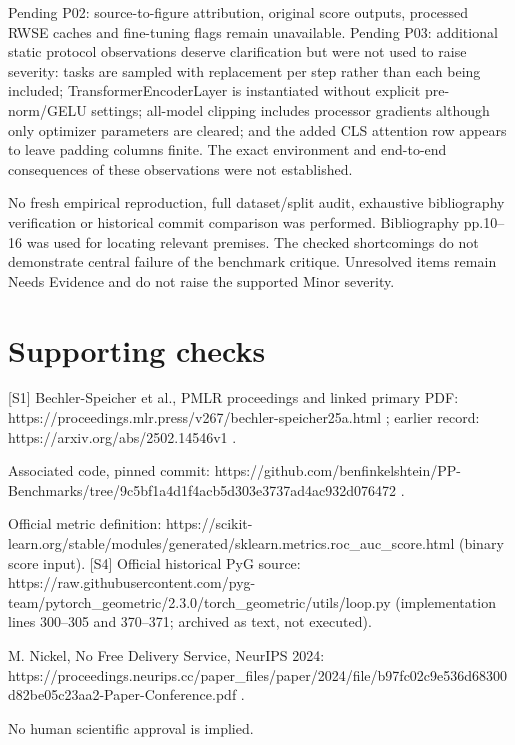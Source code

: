\documentclass[10pt]{article}
\begin{document}
Pending P02: source-to-figure attribution, original score outputs, processed RWSE caches and fine-tuning flags remain unavailable. Pending P03: additional static protocol observations deserve clarification but were not used to raise severity: tasks are sampled with replacement per step rather than each being included; TransformerEncoderLayer is instantiated without explicit pre-norm/GELU settings; all-model clipping includes processor gradients although only optimizer parameters are cleared; and the added CLS attention row appears to leave padding columns finite. The exact environment and end-to-end consequences of these observations were not established.\par
No fresh empirical reproduction, full dataset/split audit, exhaustive bibliography verification or historical commit comparison was performed. Bibliography pp.10–16 was used for locating relevant premises. The checked shortcomings do not demonstrate central failure of the benchmark critique. Unresolved items remain Needs Evidence and do not raise the supported Minor severity.\par
\section*{Supporting checks}
[S1] Bechler-Speicher et al., PMLR proceedings and linked primary PDF: https://proceedings.mlr.press/v267/bechler-speicher25a.html ; earlier record: https://arxiv.org/abs/2502.14546v1 .\par
Associated code, pinned commit: https://github.com/benfinkelshtein/PP-Benchmarks/tree/9c5bf1a4d1f4acb5d303e3737ad4ac932d076472 .\par
Official metric definition: https://scikit-learn.org/stable/modules/generated/sklearn.metrics.roc\_auc\_score.html (binary score input). [S4] Official historical PyG source: https://raw.githubusercontent.com/pyg-team/pytorch\_geometric/2.3.0/torch\_geometric/utils/loop.py (implementation lines 300–305 and 370–371; archived as text, not executed).\par
M. Nickel, No Free Delivery Service, NeurIPS 2024: https://proceedings.neurips.cc/paper\_files/paper/2024/file/b97fc02c9e536d68300d82be05c23aa2-Paper-Conference.pdf .\par
No human scientific approval is implied.\par
\end{document}
